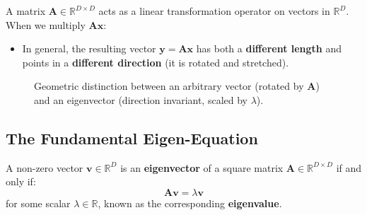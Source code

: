 \documentclass[11pt, a4paper]{article}
\begin{document}
A matrix $\mathbf{A} \in \mathbb{R}^{D \times D}$ acts as a linear transformation operator on vectors in $\mathbb{R}^D$. When we multiply $\mathbf{A}\mathbf{x}$:
\begin{itemize}[leftmargin=1.2em]
    \item In general, the resulting vector $\mathbf{y} = \mathbf{A}\mathbf{x}$ has both a \textbf{different length} and points in a \textbf{different direction} (it is rotated and stretched).
\end{itemize}

\begin{figure}[H]
\centering
{}
\caption{Geometric distinction between an arbitrary vector (rotated by $\mathbf{A}$) and an eigenvector (direction invariant, scaled by $\lambda$).}
\label{fig:eigen_intuition}
\end{figure}

\subsection{The Fundamental Eigen-Equation}

\begin{eqbox}
A non-zero vector $\mathbf{v} \in \mathbb{R}^D$ is an \textbf{eigenvector} of a square matrix $\mathbf{A} \in \mathbb{R}^{D \times D}$ if and only if:
\begin{equation}
\mathbf{A}\mathbf{v} = \lambda \mathbf{v}
\end{equation}
for some scalar $\lambda \in \mathbb{R}$, known as the corresponding \textbf{eigenvalue}.
\end{eqbox}
\end{document}
